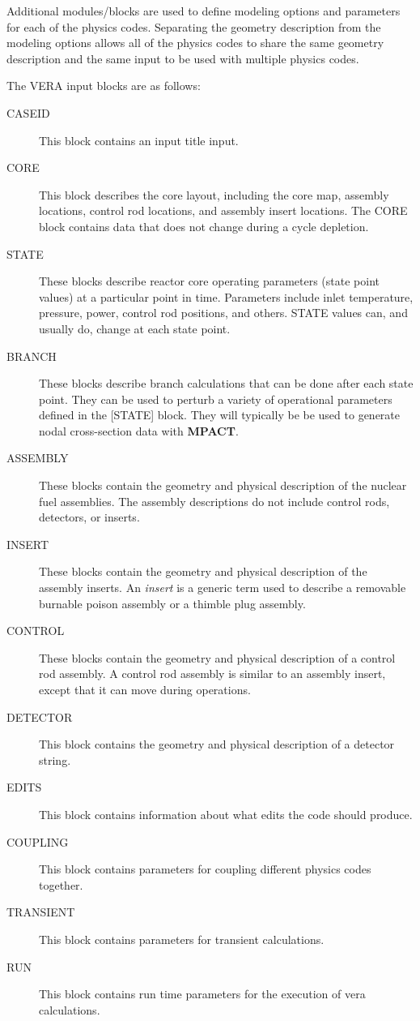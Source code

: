 \documentclass{vera-ornltm}
\begin{document}
Additional modules/blocks are used to define modeling options and parameters for each of the physics
codes. Separating the geometry description from the modeling options allows all of the
physics codes to share the same geometry description and the same input to be
used with multiple physics codes.

The VERA input blocks are as follows:
\begin{description}
\item[CASEID] This block contains an input title input.
\item[CORE] This block describes the core layout, including the core map, assembly locations,
  control rod locations, and assembly insert locations. The CORE block contains data that does not change
  during a cycle depletion.
\item[STATE] These blocks describe reactor core operating parameters (state point values)
  at a particular point in time.
  Parameters include inlet temperature, pressure, power, control rod positions, and others.
  STATE values can, and usually do, change at each state point.
\item[BRANCH] These blocks describe branch calculations that can be done after each state point.
  They can be used to perturb a variety of operational parameters defined in the [STATE] block.
  They will typically be be used to generate nodal cross-section data with {\bf MPACT}.
\item[ASSEMBLY] These blocks contain the geometry and physical description of the nuclear fuel assemblies.
  The assembly descriptions do not include control rods, detectors, or inserts.
\item[INSERT] These blocks contain the geometry and physical description of the assembly inserts.
   An \textit{insert} is a generic term used to describe a removable burnable poison assembly or a thimble plug assembly.
\item[CONTROL] These blocks contain the geometry and physical description of a control rod assembly.
   A control rod assembly is similar to an assembly insert, except that it can move
   during operations.
\item[DETECTOR] This block contains the geometry and physical description of a detector string.
\item[EDITS] This block contains information about what edits the code should produce.
\item[COUPLING] This block contains parameters for coupling different physics codes together.
\item[TRANSIENT] This block contains parameters for transient calculations.
\item[RUN] This block contains run time parameters for the execution of \ac{vera} calculations.
\end{description}
\end{document}
